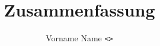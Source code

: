 \documentclass[header, margin=big]{../hsrzf}
\date{\thesemester}
\title{\textsl{\themodule} Zusammenfassung}
\author{Vorname Name \texttt{<\theauthoremail>}}
\begin{document}
\maketitle

\blinddocument
\end{document}

